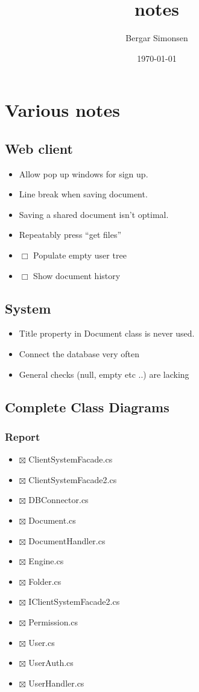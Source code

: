 \documentclass[11pt]{article}
\title{notes}
\author{Bergar Simonsen}
\date{\today}
\begin{document}
\maketitle

\setcounter{tocdepth}{3}
\tableofcontents
\vspace*{1cm}
\section{Various notes}
\label{sec-1}
\subsection{Web client}
\label{sec-1-1}

\begin{itemize}
\item Allow pop up windows for sign up.
\item Line break when saving document.
\item Saving a shared document isn't optimal.
\item Repeatably press ``get files''
\item $\Box$ Populate empty user tree
\item $\Box$ Show document history
\end{itemize}
\subsection{System}
\label{sec-1-2}

\begin{itemize}
\item Title property in Document class is never used.
\item Connect the database very often
\item General checks (null, empty etc ..) are lacking
\end{itemize}
\subsection{Complete Class Diagrams}
\label{sec-1-3}
\subsubsection{Report}
\label{sec-1-3-1}

\begin{itemize}
\item $\boxtimes$ ClientSystemFacade.cs
\item $\boxtimes$ ClientSystemFacade2.cs
\item $\boxtimes$ DBConnector.cs
\item $\boxtimes$ Document.cs
\item $\boxtimes$ DocumentHandler.cs
\item $\boxtimes$ Engine.cs
\item $\boxtimes$ Folder.cs
\item $\boxtimes$ IClientSystemFacade2.cs
\item $\boxtimes$ Permission.cs
\item $\boxtimes$ User.cs
\item $\boxtimes$ UserAuth.cs
\item $\boxtimes$ UserHandler.cs
\end{itemize}
\end{document}

